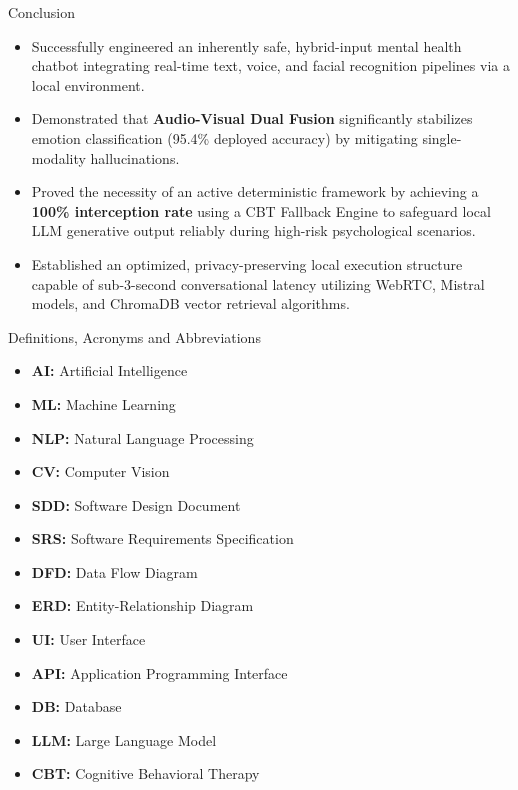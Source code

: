 \documentclass[11pt]{beamer}
\begin{document}
\begin{frame}{Conclusion}
\justifying
\begin{itemize}
    \item Successfully engineered an inherently safe, hybrid-input mental health chatbot integrating real-time text, voice, and facial recognition pipelines via a local environment.
    \item Demonstrated that \textbf{Audio-Visual Dual Fusion} significantly stabilizes emotion classification (95.4\% deployed accuracy) by mitigating single-modality hallucinations.
    \item Proved the necessity of an active deterministic framework by achieving a \textbf{100\% interception rate} using a CBT Fallback Engine to safeguard local LLM generative output reliably during high-risk psychological scenarios.
    \item Established an optimized, privacy-preserving local execution structure capable of sub-3-second conversational latency utilizing WebRTC, Mistral models, and ChromaDB vector retrieval algorithms.
\end{itemize}
\end{frame}

\begin{frame}{Definitions, Acronyms and Abbreviations}
    \justifying
    \begin{itemize}
        \item \textbf{AI:} Artificial Intelligence
        \item \textbf{ML:} Machine Learning
        \item \textbf{NLP:} Natural Language Processing
        \item \textbf{CV:} Computer Vision
        \item \textbf{SDD:} Software Design Document
        \item \textbf{SRS:} Software Requirements Specification
        \item \textbf{DFD:} Data Flow Diagram
        \item \textbf{ERD:} Entity-Relationship Diagram
        \item \textbf{UI:} User Interface
        \item \textbf{API:} Application Programming Interface
        \item \textbf{DB:} Database
        \item \textbf{LLM:} Large Language Model
        \item \textbf{CBT:} Cognitive Behavioral Therapy
    \end{itemize}
\end{frame}
\end{document}
